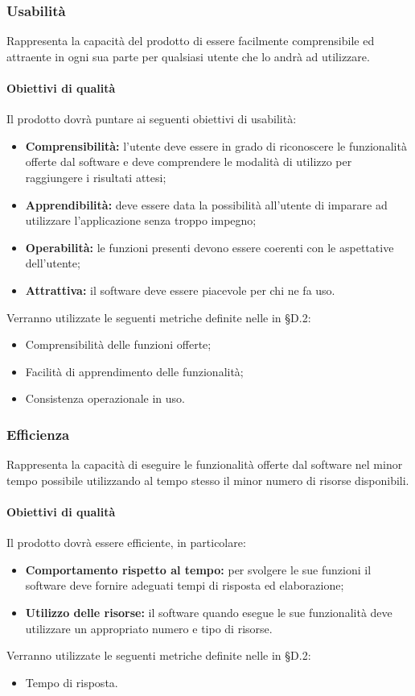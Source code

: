 \documentclass[PianoDiQualifica.tex]{subfiles}
\begin{document}
\subsubsection{Usabilità}
Rappresenta la capacità del prodotto di essere facilmente comprensibile ed attraente in ogni sua parte per qualsiasi utente che lo andrà ad utilizzare.
\paragraph{Obiettivi di qualità}
Il prodotto dovrà puntare ai seguenti obiettivi di usabilità:
\begin{itemize}
	\item \textbf{Comprensibilità:} l'utente deve essere in grado di riconoscere le funzionalità offerte dal software e deve comprendere le modalità di utilizzo per raggiungere i risultati attesi;
	\item \textbf{Apprendibilità:} deve essere data la possibilità all'utente di imparare ad utilizzare l'applicazione senza troppo impegno;
	\item \textbf{Operabilità:} le funzioni presenti devono essere coerenti con le aspettative dell'utente;
	\item \textbf{Attrattiva:} il software deve essere piacevole per chi ne fa uso.
\end{itemize}
Verranno utilizzate le seguenti metriche definite nelle \ndp in \S{D.2}:
\begin{itemize}
	\item {} Comprensibilità delle funzioni offerte;
	\item {} Facilità di apprendimento delle funzionalità;
	\item {} Consistenza operazionale in uso.
\end{itemize}

\subsubsection{Efficienza}
Rappresenta la capacità di eseguire le funzionalità offerte dal software nel minor tempo possibile utilizzando al tempo stesso il minor numero di risorse disponibili.
\paragraph{Obiettivi di qualità}
Il prodotto dovrà essere efficiente, in particolare:
\begin{itemize}
	\item \textbf{Comportamento rispetto al tempo:} per svolgere le sue funzioni il software deve fornire adeguati tempi di risposta ed elaborazione;
	\item \textbf{Utilizzo delle risorse:} il software quando esegue le sue funzionalità deve utilizzare un appropriato numero e tipo di risorse.
\end{itemize}
Verranno utilizzate le seguenti metriche definite nelle \ndp in \S{D.2}:
\begin{itemize}
	\item {} Tempo di risposta.
\end{itemize}
\end{document}
